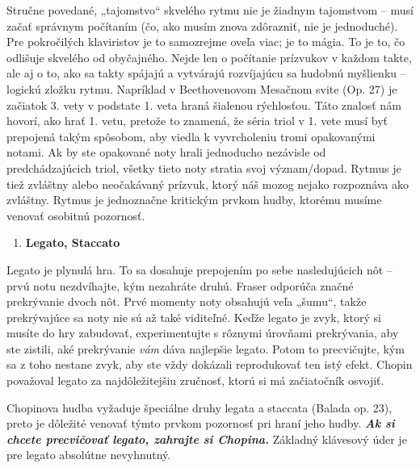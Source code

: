 \documentclass[11pt,a4paper%
]{book}
\begin{document}
Stručne povedané, „tajomstvo`` skvelého rytmu nie je žiadnym tajomstvom -- musí začať správnym počítaním (čo, ako musím znova zdôrazniť, nie je jednoduché). Pre pokročilých klaviristov je to samozrejme oveľa viac; je to mágia. To je to, čo odlišuje skvelého od obyčajného. Nejde len o počítanie prízvukov v každom takte, ale aj o to, ako sa takty spájajú a vytvárajú rozvíjajúcu sa hudobnú myšlienku -- logickú zložku rytmu. Napríklad v Beethovenovom Mesačnom svite (Op. 27) je začiatok 3. vety v podstate 1. veta hraná šialenou rýchlosťou. Táto znalosť nám hovorí, ako hrať 1. vetu, pretože to znamená, že séria triol v 1. vete musí byť prepojená takým spôsobom, aby viedla k vyvrcholeniu tromi opakovanými notami. Ak by ste opakované noty hrali jednoducho nezávisle od predchádzajúcich triol, všetky tieto noty stratia svoj význam/dopad. Rytmus je tiež zvláštny alebo neočakávaný prízvuk, ktorý náš mozog nejako rozpoznáva ako zvláštny. Rytmus je jednoznačne kritickým prvkom hudby, ktorému musíme venovať osobitnú pozornosť.

\begin{enumerate}
\def\labelenumi{\alph{enumi}.}
\setcounter{enumi}{2}
\item
  \textbf{Legato, Staccato}
\end{enumerate}

Legato je plynulá hra. To sa dosahuje prepojením po sebe nasledujúcich nôt -- prvú notu nezdvíhajte, kým nezahráte druhú. Fraser odporúča značné prekrývanie dvoch nôt. Prvé momenty noty obsahujú veľa „šumu``, takže prekrývajúce sa noty nie sú až také viditeľné. Keďže legato je zvyk, ktorý si musíte do hry zabudovať, experimentujte s rôznymi úrovňami prekrývania, aby ste zistili, aké prekrývanie \emph{vám} dáva najlepšie legato. Potom to precvičujte, kým sa z toho nestane zvyk, aby ste vždy dokázali reprodukovať ten istý efekt. Chopin považoval legato za najdôležitejšiu zručnosť, ktorú si má začiatočník osvojiť.

Chopinova hudba vyžaduje špeciálne druhy legata a staccata (Balada op. 23), preto je dôležité venovať týmto prvkom pozornosť pri hraní jeho hudby. \emph{\textbf{Ak si chcete precvičovať legato, zahrajte si Chopina.}} Základný klávesový úder je pre legato absolútne nevyhnutný.
\end{document}
